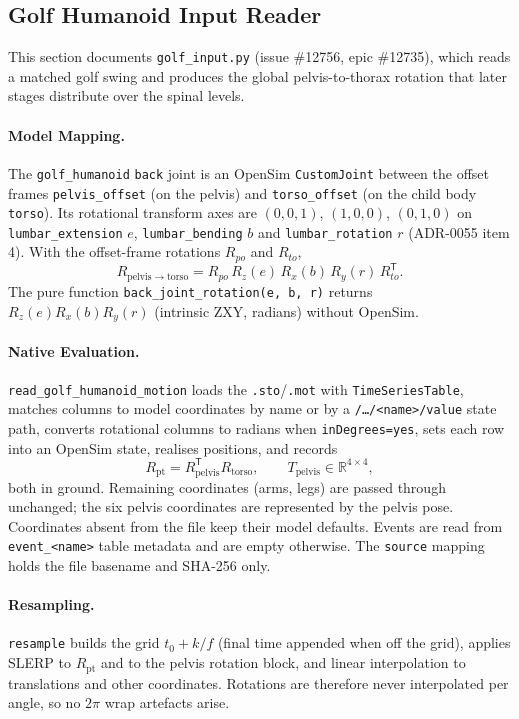 \subsection{Golf Humanoid Input Reader}
\label{sec:spn-9a}

This section documents \texttt{golf\_input.py} (issue \#12756, epic \#12735),
which reads a matched golf swing and produces the global pelvis-to-thorax
rotation that later stages distribute over the spinal levels.

\paragraph{Model Mapping.}
The \texttt{golf\_humanoid} \texttt{back} joint is an OpenSim
\texttt{CustomJoint} between the offset frames \texttt{pelvis\_offset} (on the
pelvis) and \texttt{torso\_offset} (on the child body \texttt{torso}). Its
rotational transform axes are $(0,0,1)$, $(1,0,0)$, $(0,1,0)$ on
\texttt{lumbar\_extension} $e$, \texttt{lumbar\_bending} $b$ and
\texttt{lumbar\_rotation} $r$ (ADR-0055 item 4). With the offset-frame
rotations $R_{po}$ and $R_{to}$,
\[
  R_{\mathrm{pelvis}\to\mathrm{torso}}
  = R_{po}\,R_z(e)\,R_x(b)\,R_y(r)\,R_{to}^{\mathsf T}.
\]
The pure function \texttt{back\_joint\_rotation(e, b, r)} returns
$R_z(e)R_x(b)R_y(r)$ (intrinsic ZXY, radians) without OpenSim.

\paragraph{Native Evaluation.}
\texttt{read\_golf\_humanoid\_motion} loads the \texttt{.sto}/\texttt{.mot} with
\texttt{TimeSeriesTable}, matches columns to model coordinates by name or by a
\texttt{/\ldots/<name>/value} state path, converts rotational columns to
radians when \texttt{inDegrees=yes}, sets each row into an OpenSim state,
realises positions, and records
\[
  R_{\mathrm{pt}} = R_{\mathrm{pelvis}}^{\mathsf T} R_{\mathrm{torso}},\qquad
  T_{\mathrm{pelvis}}\in\mathbb{R}^{4\times4},
\]
both in ground. Remaining coordinates (arms, legs) are passed through
unchanged; the six pelvis coordinates are represented by the pelvis pose.
Coordinates absent from the file keep their model defaults. Events are read
from \texttt{event\_<name>} table metadata and are empty otherwise. The
\texttt{source} mapping holds the file basename and SHA-256 only.

\paragraph{Resampling.}
\texttt{resample} builds the grid $t_0 + k/f$ (final time appended when off the
grid), applies SLERP to $R_{\mathrm{pt}}$ and to the pelvis rotation block,
and linear interpolation to translations and other coordinates. Rotations are
therefore never interpolated per angle, so no $2\pi$ wrap artefacts arise.

